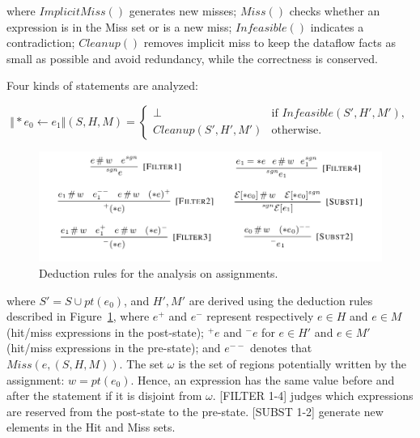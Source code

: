 where $ImplicitMiss()$ generates new misses;
$Miss()$ checks whether an expression is in the Miss set or is a new miss; 
$Infeasible()$ indicates a contradiction;
$Cleanup()$ removes implicit miss to keep the dataflow facts as small as possible and avoid redundancy, while the correctness is conserved.

Four kinds of statements are analyzed:


\[
\Vert *e_0 \gets e_1 \Vert(S,H,M)=\begin{cases}
\bot& \text{if $Infeasible(S',H',M')$},\\
Cleanup(S',H',M')& \text{otherwise}.
\end{cases}
\]


\begin{figure}
  \centering
  \includegraphics[width=1.0\columnwidth]{figs/rules_assignment}
   \caption{Deduction rules for the analysis on assignments.}
   \label{fig:rule_ass}
\end{figure}

where $S'=S\cup pt(e_0)$, and $H',M'$ are derived using the deduction rules 
described in Figure~\ref{fig:rule_ass}, where $e^+$ and $e^-$ represent 
respectively $e\in H$ and $e\in M$ (hit/miss expressions in the post-state); 
$^+e$ and $^-e$ for $e\in H'$ and $e\in M'$ (hit/miss expressions in the 
pre-state); and $e^{--}$ denotes that $Miss(e,(S,H,M))$. The set $\omega$ is 
the set of regions potentially written by the assignment: $w=pt(e_0)$. Hence,
an expression has the same value before and after the statement if it is 
disjoint from $\omega$. 
[FILTER 1-4] judges which expressions are reserved from the post-state to the 
pre-state. [SUBST 1-2] generate new elements in the Hit and Miss sets.



